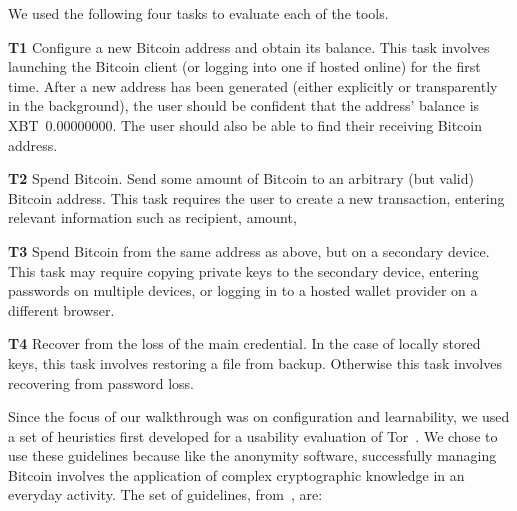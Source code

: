 We used the following four tasks to evaluate each of the tools.

\begin{compactlist}
	\item[\bf T1] Configure a new Bitcoin address and obtain its balance. This task involves launching the Bitcoin client (or logging into one if hosted online) for the first time. After a new address has been generated (either explicitly or transparently in the background), the user should be confident that the address' balance is XBT~0.00000000. The user should also be able to find their receiving Bitcoin address.\label{sec:ct-1}
	\item[\bf T2] Spend Bitcoin. Send some amount of Bitcoin to an arbitrary (but valid) Bitcoin address. This task requires the user to create a new transaction, entering relevant information such as recipient, amount, \etc\label{sec:ct-2}
	\item[\bf T3] Spend Bitcoin from the same address as above, but on a secondary device. This task may require copying private keys to the secondary device, entering passwords on multiple devices, or logging in to a hosted wallet provider on a different browser.\label{sec:ct-3}
	\item[\bf T4] Recover from the loss of the main credential. In the case of locally stored keys, this task involves restoring a file from backup. Otherwise this task involves recovering from password loss.\label{sec:ct-4}
\end{compactlist}

Since the focus of our walkthrough was on configuration and learnability, we used a set of heuristics first developed for a usability evaluation of Tor~\cite{COA07}. We chose to use these guidelines because like the anonymity software, successfully managing Bitcoin involves the application of complex cryptographic knowledge in an everyday activity. The set of guidelines, from~\cite{COA07}, are: 




